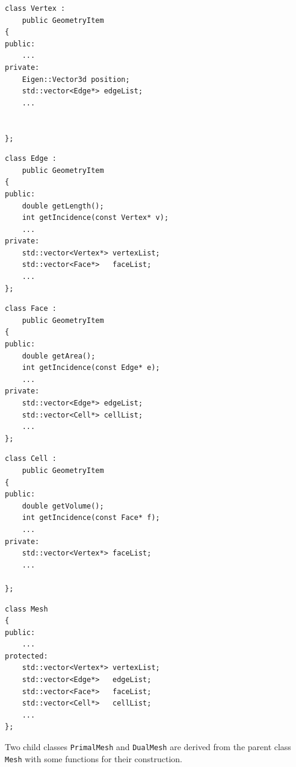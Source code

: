\documentclass{report}
\begin{document}
\begin{appendices}
\begin{minipage}{0.465\textwidth}
\begin{lstlisting}[numbers=none]
class Vertex :
    public GeometryItem
{
public:
    ...
private:
    Eigen::Vector3d position;
    std::vector<Edge*> edgeList;
    ...
    
    
};
\end{lstlisting}
\end{minipage}
\hfill
\begin{minipage}{0.465\textwidth}
\begin{lstlisting}[numbers=none]
class Edge :
    public GeometryItem
{
public:
    double getLength();
    int getIncidence(const Vertex* v);
    ...
private:
    std::vector<Vertex*> vertexList;
    std::vector<Face*>   faceList;
    ...
};
\end{lstlisting}
\end{minipage}

\begin{minipage}{0.465\textwidth}
\begin{lstlisting}[numbers=none]
class Face :
    public GeometryItem
{
public:
    double getArea();
    int getIncidence(const Edge* e);
    ...
private:
    std::vector<Edge*> edgeList;
    std::vector<Cell*> cellList;
    ...
};
\end{lstlisting}
\end{minipage}
\hfill
\begin{minipage}{0.465\textwidth}
\begin{lstlisting}[numbers=none]
class Cell :
    public GeometryItem
{
public:
    double getVolume();
    int getIncidence(const Face* f);
    ...
private:
    std::vector<Vertex*> faceList;
    ...
    
};
\end{lstlisting}
\end{minipage}

\hfill
\begin{minipage}{0.97\textwidth}
\begin{lstlisting}[numbers=none]
class Mesh
{
public:
    ...
protected:
    std::vector<Vertex*> vertexList;
    std::vector<Edge*>   edgeList;
    std::vector<Face*>   faceList;
    std::vector<Cell*>   cellList;
    ...
};
\end{lstlisting}
\end{minipage}

Two child classes \texttt{PrimalMesh} and \texttt{DualMesh} are derived from the parent class \texttt{Mesh} with some functions for their construction.


\end{appendices}
\end{document}
